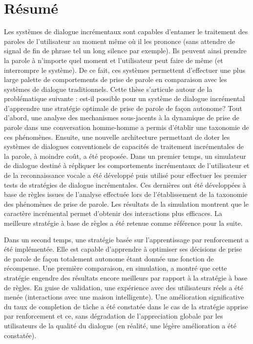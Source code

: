 \chapter*{R\'esum\'e}

     Les syst\`emes de dialogue incr\'ementaux sont capables d'entamer le traitement des paroles de l'utilisateur au moment m\^eme o\`u il les prononce (sans attendre de signal de fin de phrase tel un long silence par exemple). Ils peuvent ainsi prendre la parole \`a n'importe quel moment et l'utilisateur peut faire de m\^eme (et interrompre le syst\`eme). De ce fait, ces syst\`emes permettent d'effectuer une plus large palette de comportements de prise de parole en comparaison avec les syst\`emes de dialogue traditionnels. Cette th\`ese s'articule autour de la probl\'ematique suivante : est-il possible pour un syst\`eme de dialogue incr\'emental d'apprendre une strat\'egie optimale de prise de parole de fa\c con autonome? Tout d'abord, une analyse des mechanismes sous-jacents \`a la dynamique de prise de parole dans une conversation homme-homme a permis d'\'etablir une taxonomie de ces ph\'enom\`enes. Ensuite, une nouvelle architecture permettant de doter les syst\`emes de dialogues conventionels de capacit\'es de traitement incr\'ementales de la parole, \`a moindre co\^ut, a \'et\'e propos\'ee. Dans un premier temps, un simulateur de dialogue destin\'e \`a r\'epliquer les comportements incr\'ementaux de l'utilisateur et de la reconnaissance vocale a \'et\'e d\'evelopp\'e puis utilis\'e pour effectuer les premier tests de strat\'egies de dialogue incr\'ementales. Ces derni\`eres ont \'et\'e d\'evelopp\'ees \`a base de r\`egles issues de l'analyse effectu\'ee lors de l'\'etablissement de la taxonomie des ph\'enom\`enes de prise de parole. Les r\'esultats de la simulation montrent que le caract\`ere incr\'emental permet d'obtenir des interactions plus efficaces. La meilleure strat\'egie \`a base de r\`egles a \'et\'e retenue comme r\'ef\'erence pour la suite.

     Dans un second temps, une strat\'egie bas\'ee sur l'apprentissage par renforcement a \'et\'e impl\'ement\'ee. Elle est capable d'apprendre \`a optimiser ses d\'ecisions de prise de parole de fa\c con totalement autonome \'etant donn\'ee une fonction de r\'ecompense. Une premi\`ere comparaison, en simulation, a montr\'e que cette strat\'egie engendre des r\'esultats encore meilleurs par rapport \`a la strat\'egie \`a base de r\`egles. En guise de validation, une exp\'erience avec des utilisateurs r\'eels a \'et\'e men\'ee (interactions avec une maison intelligente). Une am\'elioration significative du taux de completion de t\^ache a \'et\'e constat\'ee dans le cas de la strat\'egie apprise par renforcement et ce, sans d\'egradation de l'appreciation globale par les utilisateurs de la qualit\'e du dialogue (en r\'ealit\'e, une l\'eg\`ere am\'elioration a \'et\'e constat\'ee).
